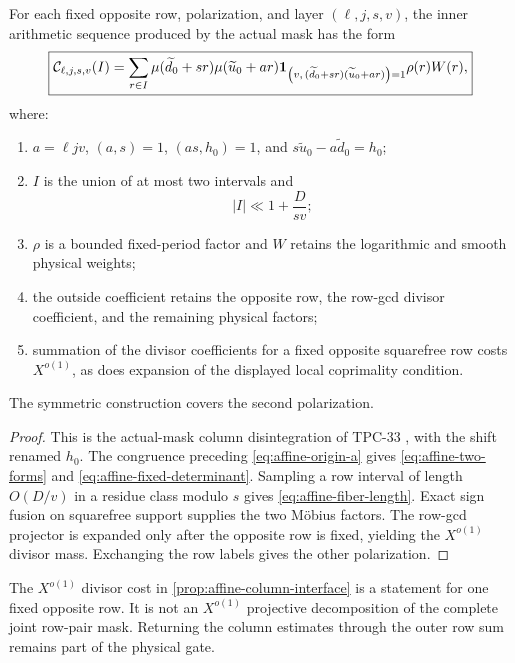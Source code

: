 \begin{proposition}
\label{prop:affine-column-interface}
For each fixed opposite row, polarization, and layer
\((\ell,j,s,v)\), the inner arithmetic sequence produced by the
actual mask has the form
\begin{equation}
 \boxed{
 \mathcal C_{\ell,j,s,v}(I)
 =
 \sum_{r\in I}
 \mu(\widetilde d_0+sr)
 \mu(\widetilde u_0+ar)
 \mathbf 1_{\left(v,\,
   (\widetilde d_0+sr)(\widetilde u_0+ar)\right)=1}
 \rho(r)W(r),}
 \label{eq:affine-literal-correlation}
\end{equation}
where:
\begin{enumerate}[label=\textup{(\alph*)},leftmargin=2.3em]
 \item \(a=\ell jv\),
 \((a,s)=1\), \((as,h_0)=1\), and
 \(s\widetilde u_0-a\widetilde d_0=h_0\);
 \item \(I\) is the union of at most two intervals and
 \begin{equation}
 |I|\ll 1+\frac{D}{sv};
 \label{eq:affine-fiber-length}
 \end{equation}
 \item \(\rho\) is a bounded fixed-period factor and \(W\) retains
 the logarithmic and smooth physical weights;
 \item the outside coefficient retains the opposite row, the
 row-gcd divisor coefficient, and the remaining physical factors;
 \item summation of the divisor coefficients for a fixed opposite
 squarefree row costs \(X^{o(1)}\), as does expansion of the displayed
 local coprimality condition.
\end{enumerate}
The symmetric construction covers the second polarization.
\end{proposition}

\begin{proof}
This is the actual-mask column disintegration of TPC-33
\citep{WangTPC33}, with the shift renamed \(h_0\).  The congruence
preceding \eqref{eq:affine-origin-a} gives
\eqref{eq:affine-two-forms} and
\eqref{eq:affine-fixed-determinant}.  Sampling a row interval of
length \(O(D/v)\) in a residue class modulo \(s\) gives
\eqref{eq:affine-fiber-length}.  Exact sign fusion on squarefree
support supplies the two M\"obius factors.  The row-gcd projector is
expanded only after the opposite row is fixed, yielding the
\(X^{o(1)}\) divisor mass.  Exchanging the row labels gives the other
polarization.
\end{proof}

\begin{remark}
\label{rem:affine-mask-complexity}
The \(X^{o(1)}\) divisor cost in
\cref{prop:affine-column-interface} is a statement for one fixed
opposite row.  It is not an \(X^{o(1)}\) projective decomposition of
the complete joint row-pair mask.  Returning the column estimates
through the outer row sum remains part of the physical gate.
\end{remark}

